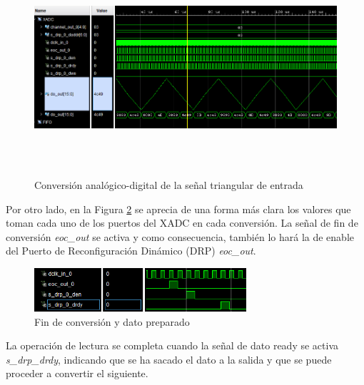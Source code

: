 \begin{figure}[h]
    \centering
    \includegraphics[width=1\textwidth, height=8cm]{img/simu/xadc.PNG}
    \caption{Conversión analógico-digital de la señal triangular de entrada}
    \label{fig:xadc}
\end{figure}

\vspace{3mm}
\pagebreak

Por otro lado, en la Figura \ref{fig:xadc2} se aprecia de una forma más clara los valores que toman cada uno de los puertos del XADC en cada conversión. La señal de fin de conversión \textit{eoc\_out} se activa y como consecuencia, también lo hará la de enable del Puerto de Reconfiguración Dinámico (DRP) \textit{eoc\_out}. 

\vspace{3mm}

\begin{figure}[h]
    \centering
    \includegraphics[width=0.7\textwidth]{img/simu/xadc2.PNG}
    \caption{Fin de conversión y dato preparado}
    \label{fig:xadc2}
\end{figure}

\vspace{3mm}

La operación de lectura se completa cuando la señal de dato ready se activa \textit{s\_drp\_drdy}, indicando que se ha sacado el dato a la salida y que se puede proceder a convertir el siguiente.

\vspace{3mm}

